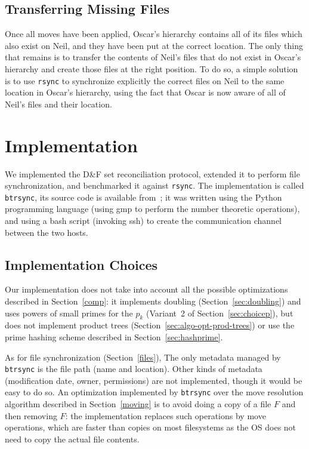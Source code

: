\documentclass[11pt]{llncs}
\newcommand{\df}{D\&F\xspace}
\newcommand{\btrsync}{\texttt{btrsync}\xspace}
\newcommand{\rsync}{\texttt{rsync}\xspace}
\begin{document}
\subsection{Transferring Missing Files}
\label{transferring}

Once all moves have been applied, Oscar's hierarchy contains all of its files
which also exist on Neil, and they have been put at the correct location. The
only thing that remains is to transfer the contents of Neil's files that do not
exist in Oscar's hierarchy and create those files at the right position. To do
so, a simple solution is to use \rsync to synchronize explicitly the correct
files on Neil to the same location in Oscar's hierarchy, using the fact that
Oscar is now aware of all of Neil's files and their location.

\section{Implementation}
\label{program}

We implemented the \df set reconciliation protocol, extended it to perform file
synchronization, and benchmarked it against \rsync. The implementation is called
\btrsync, its source code is available from~\cite{Robin}; it was written using
the Python programming language (using {\sf gmp} to perform the number theoretic
operations), and using a bash script (invoking ssh) to create the communication
channel between the two hosts.

\subsection{Implementation Choices}

Our implementation does not take into account all the possible optimizations
described in Section~\ref{comp}: it implements doubling
(Section~\ref{sec:doubling}) and uses powers of small primes for the $p_k$
(Variant~2 of Section~\ref{sec:choicep}), but does not implement product trees
(Section~\ref{sec:algo-opt-prod-trees}) or use the prime hashing scheme
described in Section~\ref{sec:hashprime}.

As for file synchronization (Section~\ref{files}), The only metadata managed by
\btrsync is the file path (name and location). Other kinds of metadata
(modification date, owner, permissions) are not implemented, though it would be
easy to do so. An optimization implemented by \btrsync over the move resolution algorithm described in Section~\ref{moving} is to avoid doing a copy of a file $F$ and then removing $F$: the implementation replaces such operations by move operations, which are faster than copies on most filesystems as the OS does not need to copy the actual file contents.
\end{document}

